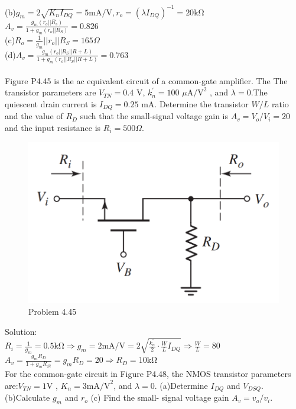 \documentclass[a4paper,11pt,UTF8]{article}
\begin{document}
(b)$g_m=2\sqrt{K_nI_{DQ}}=5\mathrm{mA/V},r_o=(\lambda I_{DQ})^{-1}=20\mathrm{k\Omega}$\\
$\displaystyle A_v=\frac{g_m(r_o||R_s)}{1+g_m(r_o||R_S)}=0.826$\\
(c)$\displaystyle R_o=\frac1{g_m}||r_o||R_S=165\Omega$\\
(d)$\displaystyle A_v=\frac{g_m(r_o||R_S||R+L)}{1+g_m(r_o||R_S||R+L)}=0.763$\\\\
 Figure P4.45 is the ac equivalent circuit of a common-gate amplifier. The
The transistor parameters are $V_{TN}=0.4$ V, $k_n^{\prime}=100$ $\mu \mathrm{A/V}^2$ , and $\lambda=0.$The quiescent drain current is $I_{DQ}=0.25$ mA. Determine the transistor $W/L$ ratio and the value of $R_D$  such that the small-signal voltage gain is  $A_v=V_o/V_i=20$ and the input resistance is $R_i=500\Omega$.
\begin{figure}[H] 
	\centering 
	\includegraphics[scale=0.3]{MD4.45.png}
	\caption{Problem 4.45}
\end{figure}
\noindent Solution:\\
$\displaystyle R_i=\frac1{g_m}=0.5\mathrm{k\Omega}\Rightarrow g_m=2\mathrm{mA/V}=2\sqrt{\frac{k_n^\prime}{2}\cdot\frac{W}{L} {I_{DQ}}}\Rightarrow \frac{W}{L}=80$\\
$\displaystyle A_v=\frac{g_mR_D}{1+g_mR_{Si}}=g_mR_D=20\Rightarrow R_D=10\mathrm{k\Omega}$\\
 For the common-gate circuit in Figure P4.48, the NMOS transistor parameters are:$V_{TN}=1\mathrm{V}$ , $K_n=3 \mathrm{mA/V}^2$, and $\lambda=0$. (a)Determine $I_{DQ}$ and $V_{DSQ}.$
(b)Calculate $g_m$ and $r_o$ (c) Find the small- signal voltage gain $A_v=v_o/v_i.$  \\
\end{document}
